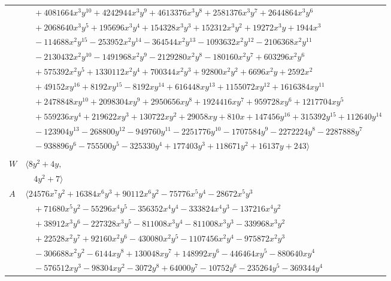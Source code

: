 \documentclass[11pt]{article}
\begin{document}
\begin{longtable}{@{}ll@{}}
 & $\quad +4081664x^{3}y^{10}+4242944x^{3}y^{9}+4613376x^{3}y^{8}+2581376x^{3}y^{7}+2644864x^{3}y^{6}$\\
 & $\quad +2068640x^{3}y^{5}+195696x^{3}y^{4}+154328x^{3}y^{3}+152312x^{3}y^{2}+19272x^{3}y+1944x^{3}$\\
 & $\quad -114688x^{2}y^{15}-253952x^{2}y^{14}-364544x^{2}y^{13}-1093632x^{2}y^{12}-2106368x^{2}y^{11}$\\
 & $\quad -2130432x^{2}y^{10}-1491968x^{2}y^{9}-2129280x^{2}y^{8}-180160x^{2}y^{7}+603296x^{2}y^{6}$\\
 & $\quad +575392x^{2}y^{5}+1330112x^{2}y^{4}+700344x^{2}y^{3}+92800x^{2}y^{2}+6696x^{2}y+2592x^{2}$\\
 & $\quad +49152xy^{16}+8192xy^{15}-8192xy^{14}+616448xy^{13}+1155072xy^{12}+1616384xy^{11}$\\
 & $\quad +2478848xy^{10}+2098304xy^{9}+2950656xy^{8}+1924416xy^{7}+959728xy^{6}+1217704xy^{5}$\\
 & $\quad +559236xy^{4}+219622xy^{3}+130722xy^{2}+29058xy+810x+147456y^{16}+315392y^{15}+112640y^{14}$\\
 & $\quad -123904y^{13}-268800y^{12}-949760y^{11}-2251776y^{10}-1707584y^{9}-2272224y^{8}-2287888y^{7}$\\
 & $\quad -938896y^{6}-755500y^{5}-325330y^{4}+177403y^{3}+118671y^{2}+16137y+243\rangle$\\
\addlinespace[2pt]
\multicolumn{2}{@{}p{0.97\textwidth}@{}}{$i=47$, $D_i=8$, $\rho_{ij}$: $0{:}2, \allowbreak 6{:}2, \allowbreak 16{:}2, \allowbreak 26{:}1, \allowbreak 36{:}2, \allowbreak 48{:}2$}\\
$W$ & $\langle 8y^{2}+4y,$\\
 & $\quad 4y^{2}+7\rangle$\\
$A$ & $\langle 24576x^{7}y^{2}+16384x^{6}y^{3}+90112x^{6}y^{2}-75776x^{5}y^{4}-28672x^{5}y^{3}$\\
 & $\quad +71680x^{5}y^{2}-55296x^{4}y^{5}-356352x^{4}y^{4}-333824x^{4}y^{3}-137216x^{4}y^{2}$\\
 & $\quad +38912x^{3}y^{6}-227328x^{3}y^{5}-811008x^{3}y^{4}-811008x^{3}y^{3}-339968x^{3}y^{2}$\\
 & $\quad +22528x^{2}y^{7}+92160x^{2}y^{6}-430080x^{2}y^{5}-1107456x^{2}y^{4}-975872x^{2}y^{3}$\\
 & $\quad -306688x^{2}y^{2}-6144xy^{8}+130048xy^{7}+148992xy^{6}-446464xy^{5}-880640xy^{4}$\\
 & $\quad -576512xy^{3}-98304xy^{2}-3072y^{8}+64000y^{7}-10752y^{6}-235264y^{5}-369344y^{4}$\\

\end{longtable}
\end{document}
